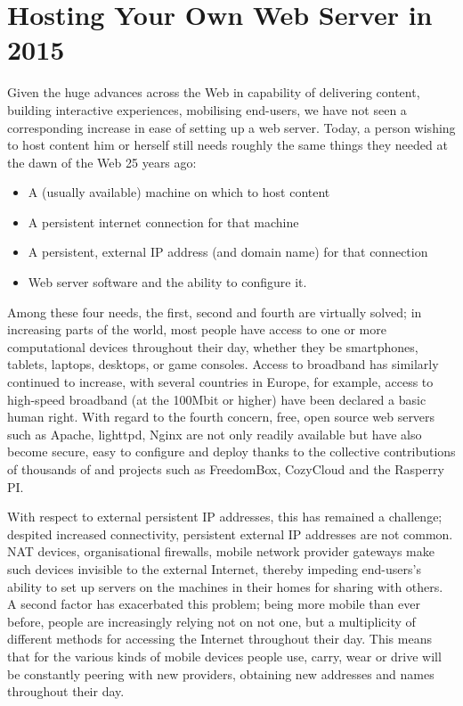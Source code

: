\documentclass{amsart}
\begin{document}
\section{Hosting Your Own Web Server in 2015}

Given the huge advances across the Web in capability of delivering content, building interactive experiences, mobilising end-users, we have not seen a corresponding increase in ease of setting up a web server.  Today, a person wishing to host content him or herself still needs roughly the same things they needed at the dawn of the Web 25 years ago:

\begin{itemize}
\item A (usually available) machine on which to host content
\item A persistent internet connection for that machine
\item A persistent, external IP address (and domain name) for that connection
\item Web server software and the ability to configure it.
\end{itemize}

Among these four needs, the first, second and fourth are virtually solved; in increasing parts of the world, most people have access to one or more computational devices throughout their day, whether they be smartphones, tablets, laptops, desktops, or game consoles.  Access to broadband has similarly continued to increase, with several countries in Europe, for example, access to high-speed broadband (at the 100Mbit or higher) have been declared a basic human right.  With regard to the fourth concern, free, open source web servers such as Apache, lighttpd, Nginx are not only readily available but have also become secure, easy to configure and deploy thanks to the collective contributions of thousands of and projects such as FreedomBox, CozyCloud and the Rasperry PI. 

With respect to external persistent IP addresses, this has remained a challenge; despited increased connectivity, persistent external IP addresses are not common.  NAT devices, organisational firewalls, mobile network provider gateways make such devices invisible to the external Internet, thereby impeding end-users's ability to set up servers on the machines in their homes for sharing with others.  A second factor has exacerbated this problem; being more mobile than ever before, people are increasingly relying not on not one, but a multiplicity of different methods for accessing the Internet throughout their day.  This means that for the various kinds of mobile devices people use, carry, wear or drive will be constantly peering with new providers, obtaining new addresses and names throughout their day.
\end{document}
